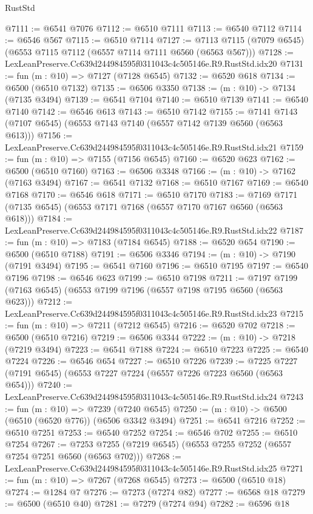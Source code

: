 \begin{lexlean}{RustStd}
\begin{coremodule}
@7111 := @6541 @7076
@7112 := @6510 @7111
@7113 := @6540 @7112
@7114 := @6546 @567
@7115 := @6510 @7114
@7127 := @7113 @7115 (@7079 @6545) (@6553 @7115 @7112 (@6557 @7114 @7111 @6560 (@6563 @567)))
@7128 := LexLeanPreserve.Cc639d244984595f0311043c4c505146e.R9.RustStd.idx20
@7131 := fun (m : @10) => @7127 (@7128 @6545)
@7132 := @6520 @618
@7134 := @6500 (@6510 @7132)
@7135 := @6506 @3350
@7138 := (m : @10) -> @7134 (@7135 @3494)
@7139 := @6541 @7104
@7140 := @6510 @7139
@7141 := @6540 @7140
@7142 := @6546 @613
@7143 := @6510 @7142
@7155 := @7141 @7143 (@7107 @6545) (@6553 @7143 @7140 (@6557 @7142 @7139 @6560 (@6563 @613)))
@7156 := LexLeanPreserve.Cc639d244984595f0311043c4c505146e.R9.RustStd.idx21
@7159 := fun (m : @10) => @7155 (@7156 @6545)
@7160 := @6520 @623
@7162 := @6500 (@6510 @7160)
@7163 := @6506 @3348
@7166 := (m : @10) -> @7162 (@7163 @3494)
@7167 := @6541 @7132
@7168 := @6510 @7167
@7169 := @6540 @7168
@7170 := @6546 @618
@7171 := @6510 @7170
@7183 := @7169 @7171 (@7135 @6545) (@6553 @7171 @7168 (@6557 @7170 @7167 @6560 (@6563 @618)))
@7184 := LexLeanPreserve.Cc639d244984595f0311043c4c505146e.R9.RustStd.idx22
@7187 := fun (m : @10) => @7183 (@7184 @6545)
@7188 := @6520 @654
@7190 := @6500 (@6510 @7188)
@7191 := @6506 @3346
@7194 := (m : @10) -> @7190 (@7191 @3494)
@7195 := @6541 @7160
@7196 := @6510 @7195
@7197 := @6540 @7196
@7198 := @6546 @623
@7199 := @6510 @7198
@7211 := @7197 @7199 (@7163 @6545) (@6553 @7199 @7196 (@6557 @7198 @7195 @6560 (@6563 @623)))
@7212 := LexLeanPreserve.Cc639d244984595f0311043c4c505146e.R9.RustStd.idx23
@7215 := fun (m : @10) => @7211 (@7212 @6545)
@7216 := @6520 @702
@7218 := @6500 (@6510 @7216)
@7219 := @6506 @3344
@7222 := (m : @10) -> @7218 (@7219 @3494)
@7223 := @6541 @7188
@7224 := @6510 @7223
@7225 := @6540 @7224
@7226 := @6546 @654
@7227 := @6510 @7226
@7239 := @7225 @7227 (@7191 @6545) (@6553 @7227 @7224 (@6557 @7226 @7223 @6560 (@6563 @654)))
@7240 := LexLeanPreserve.Cc639d244984595f0311043c4c505146e.R9.RustStd.idx24
@7243 := fun (m : @10) => @7239 (@7240 @6545)
@7250 := (m : @10) -> @6500 (@6510 (@6520 @776)) (@6506 @3342 @3494)
@7251 := @6541 @7216
@7252 := @6510 @7251
@7253 := @6540 @7252
@7254 := @6546 @702
@7255 := @6510 @7254
@7267 := @7253 @7255 (@7219 @6545) (@6553 @7255 @7252 (@6557 @7254 @7251 @6560 (@6563 @702)))
@7268 := LexLeanPreserve.Cc639d244984595f0311043c4c505146e.R9.RustStd.idx25
@7271 := fun (m : @10) => @7267 (@7268 @6545)
@7273 := @6500 (@6510 @18)
@7274 := @1284 @7
@7276 := @7273 (@7274 @82)
@7277 := @6568 @18
@7279 := @6500 (@6510 @40)
@7281 := @7279 (@7274 @94)
@7282 := @6596 @18

\end{coremodule}
\end{lexlean}
